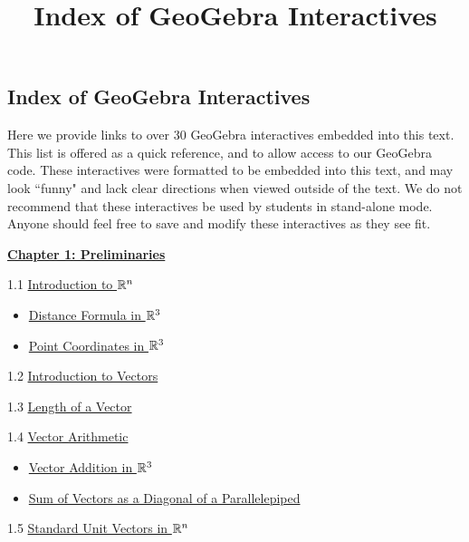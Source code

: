 \documentclass{ximera}
\title{Index of GeoGebra Interactives} \license{CC BY-NC-SA 4.0}
\begin{document}
\begin{abstract}
\end{abstract}
\maketitle

\begin{onlineOnly}
\section*{Index of GeoGebra Interactives}
\end{onlineOnly}

Here we provide links to over 30 GeoGebra interactives embedded into this text.  This list is offered as a quick reference, and to allow access to our GeoGebra code. These interactives were formatted to be embedded into this text, and may look ``funny" and lack clear directions when viewed outside of the text. We do not recommend that these interactives be used by students in stand-alone mode.  Anyone should feel free to save and modify these interactives as they see fit.


\href{\xmbaseurl/XLAChapter_prelim/main}{\textbf{Chapter 1: Preliminaries}}
	
1.1	\href{\xmbaseurl/RRN-0010/main}{Introduction to $\mathbb{R}^n$}
\begin{itemize}
\item
\href{https://www.geogebra.org/m/dc267r6v}{Distance Formula in $\mathbb{R}^3$}
\item
\href{https://www.geogebra.org/m/bynu3r84}{Point Coordinates in $\mathbb{R}^3$}
\end{itemize}
	
1.2	\href{\xmbaseurl/VEC-0010/main}{Introduction to Vectors}
	
1.3	\href{\xmbaseurl/VEC-0020/main}{Length of a Vector}
	
1.4	\href{\xmbaseurl/VEC-0030/main}{Vector Arithmetic}

\begin{itemize}
    \item 
    \href{https://www.geogebra.org/m/ccpev33m}{Vector Addition in $\mathbb{R}^3$}
    \item
    \href{https://www.geogebra.org/m/bpzfb7vr}{Sum of Vectors as a Diagonal of a Parallelepiped}
\end{itemize}
	
1.5	\href{\xmbaseurl/VEC-0035/main}{Standard Unit Vectors in $\mathbb{R}^n$}
\end{document}

